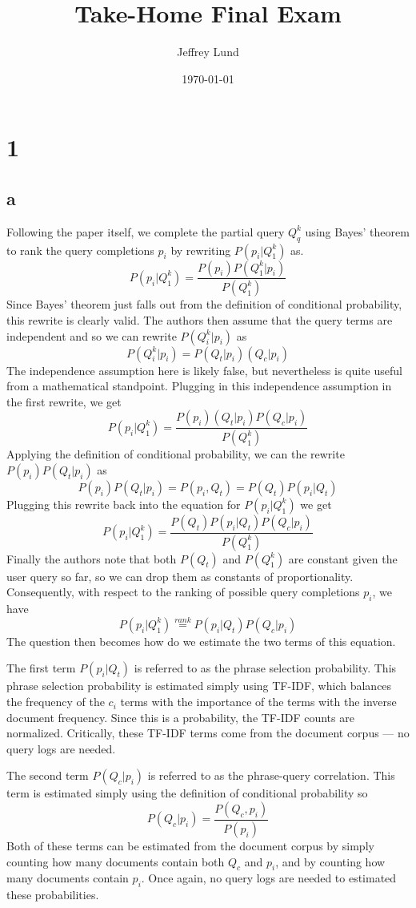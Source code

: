 \documentclass[paper=a4, fontsize=11pt]{scrartcl}
\title{\huge Take-Home Final Exam}
\author{Jeffrey Lund}
\date{\normalsize\today}
\begin{document}
\maketitle

\section*{1}

\subsection*{a}

Following the paper itself, we complete the partial query $Q_q^k$ using Bayes'
theorem to rank the query completions $p_i$ by rewriting $P(p_i|Q_1^k)$ as.
$$P(p_i|Q_1^k) = \frac{P(p_i) P(Q_1^k|p_i)}{P(Q_1^k)}$$
Since Bayes' theorem just falls out from the definition of conditional
probability, this rewrite is clearly valid.
The authors then assume that the query terms are independent and so we can
rewrite $P(Q_i^k|p_i)$ as
$$P(Q_i^k|p_i) = P(Q_t|p_i) (Q_c|p_i)$$
The independence assumption here is likely false, but nevertheless is quite
useful from a mathematical standpoint.
Plugging in this independence assumption in the first rewrite, we get
$$P(p_i|Q_1^k) = \frac{P(p_i) (Q_t|p_i)  P(Q_c|p_i)}{P(Q_1^k)}$$
Applying the definition of conditional probability, we can the rewrite
$P(p_i)P(Q_t|p_i)$ as
$$P(p_i)P(Q_t|p_i) = P(p_i,Q_t) = P(Q_t)P(p_i|Q_t)$$
Plugging this rewrite back into the equation for $P(p_i|Q_1^k)$ we get
$$P(p_i|Q_1^k) = \frac{P(Q_t)P(p_i|Q_t) P(Q_c|p_i)}{P(Q_1^k)}$$
Finally the authors note that both $P(Q_t)$ and $P(Q_1^k)$ are constant given
the user query so far, so we can drop them as constants of proportionality.
Consequently, with respect to the ranking of possible query completions $p_i$,
we have
$$P(p_i|Q_1^k) \stackrel{rank}{=} P(p_i|Q_t) P(Q_c|p_i)$$
The question then becomes how do we estimate the two terms of this equation.

The first term $P(p_i|Q_t)$ is referred to as the phrase selection probability.
This phrase selection probability is estimated simply using TF-IDF, which
balances the frequency of the $c_i$ terms with the importance of the terms
with the inverse document frequency.
Since this is a probability, the TF-IDF counts are normalized.
Critically, these TF-IDF terms come from the document corpus --- no query logs
are needed.

The second term $P(Q_c|p_i)$ is referred to as the phrase-query correlation.
This term is estimated simply using the definition of conditional probability
so
$$P(Q_c|p_i) = \frac{P(Q_c,p_i)}{P(p_i)}$$
Both of these terms can be estimated from the document corpus by simply
counting how many documents contain both $Q_c$ and $p_i$, and by counting how
many documents contain $p_i$.
Once again, no query logs are needed to estimated these probabilities.
\end{document}
